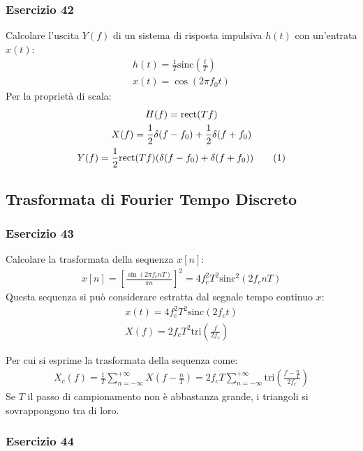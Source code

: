 \documentclass{article}
\newcommand{\rect}{\mathrm{rect}}
\newcommand{\sinc}{\mathrm{sinc}}
\newcommand{\tri}{\mathrm{tri}}
\newcommand{\tageq}{\tag{\stepcounter{equation}\theequation}}
\begin{document}
\subsubsection*{Esercizio 42}

Calcolare l'uscita $Y(f)$ di un sistema di risposta impulsiva $h(t)$ con un'entrata $x(t)$:
\begin{gather*}
    h(t)=\displaystyle\frac{1}{T}\sinc\left(\frac{t}{T}\right)\\
    x(t)=\cos(2\pi f_0t)
\end{gather*}
Per la proprietà di scala:
\begin{gather*}
    H(f)=\rect(Tf)\\
    X(f)=\displaystyle\frac{1}{2}\delta(f-f_0)+\frac{1}{2}\delta(f+f_0)\\
    Y(f)=\frac{1}{2}\rect(Tf)(\delta(f-f_0)+\delta(f+f_0))\tageq
\end{gather*}

\subsection{Trasformata di Fourier Tempo Discreto}

\subsubsection*{Esercizio 43}

Calcolare la trasformata della sequenza $x[n]$:
\begin{gather*}
    x[n]=\left[\displaystyle\frac{\sin(2\pi f_cnT)}{\pi n}\right]^2=4f_c^2T^2\sinc^2(2f_cnT)
\end{gather*}
Questa sequenza si può considerare estratta dal segnale tempo continuo $x$:
\begin{gather*}
    x(t)=4f_c^2T^2\sinc(2f_ct)\\
    X(f)=\displaystyle 2f_cT^2\tri \left(\frac{f}{2f_c}\right)
\end{gather*}

Per cui si esprime la trasformata della sequenza come:
\begin{gather}
    X_c(f)=\displaystyle\frac{1}{T}\sum_{n=-\infty}^{+\infty}X\left(f-\frac{n}{T}\right)=2f_cT\sum_{n=-\infty}^{+\infty}\tri \left(\frac{f-\frac{n}{T}}{2f_c}\right)
\end{gather}
Se $T$ il passo di campionamento non è abbastanza grande, i triangoli si sovrappongono tra di loro. 

\subsubsection*{Esercizio 44}
\end{document}
